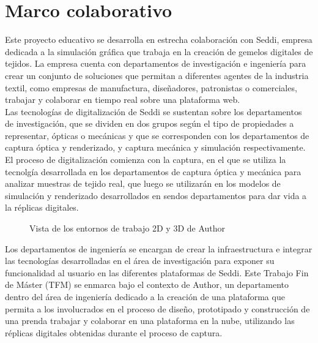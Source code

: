 \chapter{Marco colaborativo}



Este proyecto educativo se desarrolla en estrecha colaboraci\'on con Seddi, empresa dedicada a la simulaci\'on gr\'afica que
trabaja en la creaci\'on de gemelos digitales de tejidos. La empresa cuenta con departamentos de investigaci\'on e ingenier\'ia para
crear un conjunto de soluciones que permitan a diferentes agentes de la industria textil, como empresas de manufactura, dise\~nadores,
patronistas o comerciales, trabajar y colaborar en tiempo real sobre una plataforma web.\\

Las tecnolog\'ias de digitalizaci\'on de Seddi se sustentan sobre los departamentos de investigaci\'on, que se dividen en dos grupos
seg\'un el tipo de propiedades a representar, \'opticas o mec\'anicas y que se corresponden con los departamentos de captura
\'optica y renderizado, y captura mec\'anica y simulaci\'on respectivamente.
El proceso de digitalizaci\'on comienza con la captura, en el que se utiliza la tecnolg\'ia desarrollada en los departamentos de captura
\'optica y mec\'anica para analizar muestras de tejido real, que luego se utilizar\'an en los modelos de simulaci\'on y renderizado
desarrollados en sendos departamentos para dar vida a la r\'eplicas digitales. 

\begin{figure}[H]
    \vspace{0.5cm}
    \centering
    \caption[]{Vista de los entornos de trabajo 2D y 3D de Author}
\end{figure}
\newpage

Los departamentos de ingenier\'ia se encargan de crear la infraestructura e integrar las tecnolog\'ias desarrolladas en el \'area
de investigaci\'on para exponer su funcionalidad al usuario en las diferentes plataformas de Seddi.
Este Trabajo Fin de M\'aster (TFM) se enmarca bajo el contexto de Author, un departamento dentro del \'area de ingenier\'ia dedicado
a la creaci\'on de una plataforma que permita a los involucrados en el proceso de dise\~no, prototipado y construcci\'on de una prenda
trabajar y colaborar en una plataforma en la nube, utilizando las r\'eplicas digitales obtenidas durante el proceso de captura.\\

